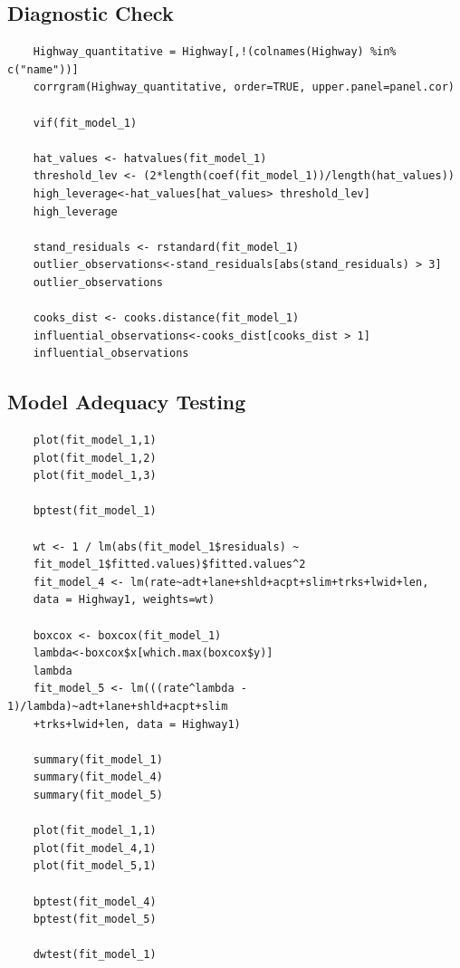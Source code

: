 \documentclass[12pt]{report}
\begin{document}
\subsection{Diagnostic Check}
\begin{lstlisting}
    Highway_quantitative = Highway[,!(colnames(Highway) %in% c("name"))]
    corrgram(Highway_quantitative, order=TRUE, upper.panel=panel.cor)

    vif(fit_model_1)

    hat_values <- hatvalues(fit_model_1)
    threshold_lev <- (2*length(coef(fit_model_1))/length(hat_values))
    high_leverage<-hat_values[hat_values> threshold_lev]
    high_leverage

    stand_residuals <- rstandard(fit_model_1)
    outlier_observations<-stand_residuals[abs(stand_residuals) > 3]
    outlier_observations

    cooks_dist <- cooks.distance(fit_model_1)
    influential_observations<-cooks_dist[cooks_dist > 1]
    influential_observations
\end{lstlisting}

\subsection{Model Adequacy Testing}
\begin{lstlisting}
    plot(fit_model_1,1)
    plot(fit_model_1,2)
    plot(fit_model_1,3)

    bptest(fit_model_1)

    wt <- 1 / lm(abs(fit_model_1$residuals) ~ 
    fit_model_1$fitted.values)$fitted.values^2
    fit_model_4 <- lm(rate~adt+lane+shld+acpt+slim+trks+lwid+len,
    data = Highway1, weights=wt)
    
    boxcox <- boxcox(fit_model_1)
    lambda<-boxcox$x[which.max(boxcox$y)]
    lambda
    fit_model_5 <- lm(((rate^lambda - 1)/lambda)~adt+lane+shld+acpt+slim
    +trks+lwid+len, data = Highway1)

    summary(fit_model_1)
    summary(fit_model_4)
    summary(fit_model_5)

    plot(fit_model_1,1)
    plot(fit_model_4,1)
    plot(fit_model_5,1)

    bptest(fit_model_4)
    bptest(fit_model_5)

    dwtest(fit_model_1)
\end{lstlisting}
\end{document}
